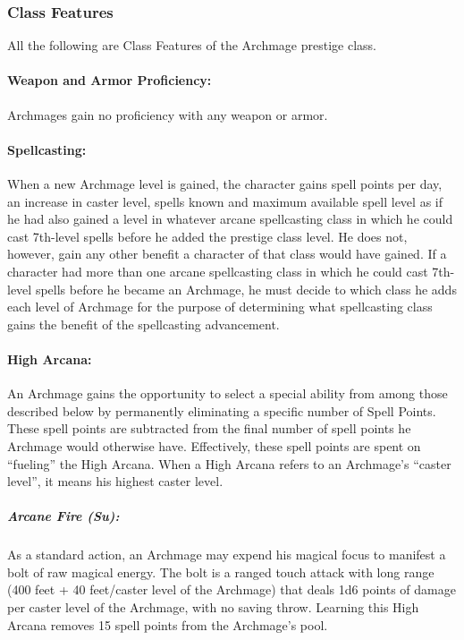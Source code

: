 \subsubsection{Class Features}
All the following are Class Features of the Archmage prestige class.

\paragraph{Weapon and Armor Proficiency:} Archmages gain no proficiency with any weapon or armor.

\paragraph{Spellcasting:} When a new Archmage level is gained, 
the character gains spell points per day, an increase in caster level, spells known and maximum available spell level
as if he had also gained a level in whatever arcane spellcasting class in which he could cast 7th-level spells before he added the prestige class level. 
He does not, however, gain any other benefit a character of that class would have gained. 
If a character had more than one arcane spellcasting class in which he could cast 7th-level spells before he became an Archmage, 
he must decide to which class he adds each level of Archmage for the purpose of determining what spellcasting class gains the benefit of the spellcasting advancement.

\paragraph{High Arcana:}
An Archmage gains the opportunity to select a special ability from among those described below by permanently eliminating a specific number of Spell Points.
These spell points are subtracted from the final number of spell points he Archmage would otherwise have.
Effectively, these spell points are spent on ``fueling'' the High Arcana.
When a High Arcana refers to an Archmage's ``caster level'', it means his highest caster level.

\subparagraph{Arcane Fire (Su):}
As a standard action, an Archmage may expend his magical focus to manifest a bolt of raw magical energy. 
The bolt is a ranged touch attack with long range (400 feet + 40 feet/caster level of the Archmage) 
that deals 1d6 points of damage per caster level of the Archmage, with no saving throw. 
Learning this High Arcana removes 15 spell points from the Archmage's pool.

